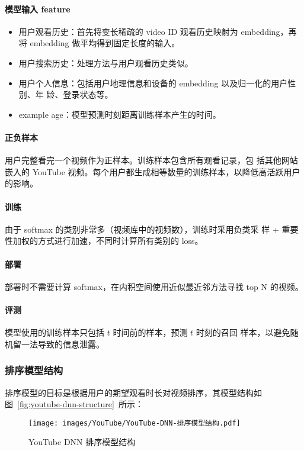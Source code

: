 \paragraph{模型输入 feature}
\begin{itemize}
  \item 用户观看历史：首先将变长稀疏的 video ID 观看历史映射为 embedding，再将
    embedding 做平均得到固定长度的输入。
  \item 用户搜索历史：处理方法与用户观看历史类似。
  \item 用户个人信息：包括用户地理信息和设备的 embedding 以及归一化的用户性别、年
    龄、登录状态等。
  \item example age：模型预测时刻距离训练样本产生的时间。
\end{itemize}
\paragraph{正负样本} 用户完整看完一个视频作为正样本。训练样本包含所有观看记录，包
括其他网站嵌入的 YouTube 视频。每个用户都生成相等数量的训练样本，以降低高活跃用户
的影响。
\paragraph{训练} 由于 softmax 的类别非常多（视频库中的视频数），训练时采用负类采
样 + 重要性加权的方式进行加速，不同时计算所有类别的 loss。
\paragraph{部署} 部署时不需要计算 softmax，在内积空间使用近似最近邻方法寻找 top
N 的视频。
\paragraph{评测} 模型使用的训练样本只包括 $t$ 时间前的样本，预测 $t$ 时刻的召回
样本，以避免随机留一法导致的信息泄露。

\subsubsection{排序模型结构}
排序模型的目标是根据用户的期望观看时长对视频排序，其模型结构如
图~\ref{fig:youtube-dnn-structure}~所示：

\begin{figure}[ht]
  \centering
  \texttt{[image: images/YouTube/YouTube-DNN-排序模型结构.pdf]}
  \caption{YouTube DNN 排序模型结构}\label{fig:youtube-dnn-ranking-structure}
\end{figure}

